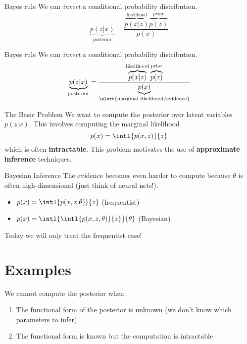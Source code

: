 \documentclass[14pt, aspectratio=169]{beamer}
\begin{document}
\begin{frame}{Bayes rule}
We can \textit{invert} a conditional probability distribution.
\begin{equation*}
\underbrace{p(z|x)}_{\text{posterior}} = \frac{\overbrace{p(x|z)}^{\text{likelihood}}\overbrace{p(z)}^{prior}}{p(x)}
\end{equation*}
\end{frame}

\begin{frame}{Bayes rule}
We can \textit{invert} a conditional probability distribution.
\begin{equation*}
\underbrace{p(z|x)}_{\text{posterior}} = \frac{\overbrace{p(x|z)}^{\text{likelihood}}\overbrace{p(z)}^{\text{prior}}}{\underbrace{p(x)}_{\text{\alert{marginal likelihood/evidence}}}}
\end{equation*}
\end{frame}

\begin{frame}{The Basic Problem}
We want to compute the posterior over latent variables $ p(z|x) $. This involves computing the marginal likelihood
$$ p(x) = \intl{ p(x,z) }{z} $$
which is often \textbf{intractable}. This problem motivates the use of \textbf{approximate inference} techniques.
\end{frame}

\begin{frame}{Bayesian Inference}
The evidence becomes even harder to compute because $ \theta $ is often high-dimensional
(just think of neural nets!).
\begin{itemize}
\item $ p(x) = \intl{ p(x, z| \theta)}{z} $ (frequentist)
\item $ p(x) = \intl{ \intl{ p(x, z, \theta)} {z}}{\theta} $ (Bayesian)
\end{itemize}
\pause
\alert{Today we will only treat the frequentist case!}
\end{frame}

\section{Examples}
\frame{\tableofcontents[currentsection]}

\begin{frame}{We cannot compute the posterior when}
\begin{enumerate}
\item The functional form of the posterior is unknown (we don't know which parameters to infer)
\item The functional form is known but the computation is intractable
\end{enumerate}
\end{frame}
\end{document}

